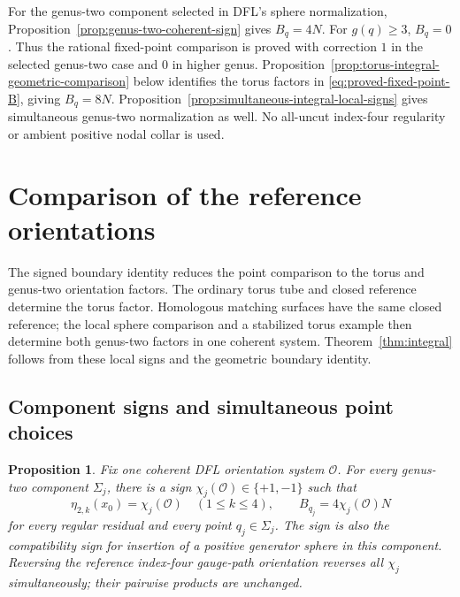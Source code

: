 \documentclass[11pt]{amsart}
\newtheorem{proposition}[theorem]{Proposition}
\theoremstyle{definition}
\theoremstyle{remark}
\theoremstyle{plain}
\begin{document}
For the genus-two component selected
in DFL's sphere normalization,
Proposition~\ref{prop:genus-two-coherent-sign}
gives $B_q=4N$. For $g(q)\ge3$,
$B_q=0$. Thus the rational
fixed-point comparison is proved
with correction $1$ in the selected
genus-two case and $0$ in higher
genus. Proposition~\ref{prop:torus-integral-geometric-comparison}
below identifies the torus factors in
\eqref{eq:proved-fixed-point-B}, giving $B_q=8N$.
Proposition~\ref{prop:simultaneous-integral-local-signs}
gives simultaneous genus-two normalization as well.
No all-uncut
index-four regularity or ambient
positive nodal collar is used.

\section{Comparison of the reference orientations}
\label{sec:reference-comparison}

The signed boundary identity reduces the point comparison to
the torus and genus-two orientation factors. The ordinary torus
tube and closed reference determine the torus factor.
Homologous matching surfaces have the same closed reference;
the local sphere comparison and a stabilized torus example
then determine both genus-two factors in one coherent system.
Theorem~\ref{thm:integral} follows from these local signs and
the geometric boundary identity.

\subsection{Component signs and simultaneous point choices}
\label{sec:component-signs-and-finite-points}

\begin{proposition}\label{prop:genus-two-component-sign}
Fix one coherent DFL orientation system $\mathcal O$.
For every genus-two component $\Sigma_j$, there is a sign
$\chi_j(\mathcal O)\in\{+1,-1\}$ such that
\[
 \eta_{2,k}(x_0)=\chi_j(\mathcal O)
       \quad(1\le k\le4),\qquad B_{q_j}=4\chi_j(\mathcal O)N
\]
for every regular residual and every point $q_j\in\Sigma_j$.
The sign is also the compatibility sign for insertion of a
positive generator sphere in this component.
Reversing the reference index-four gauge-path orientation
reverses all $\chi_j$ simultaneously; their pairwise products
are unchanged.
\end{proposition}
\end{document}
